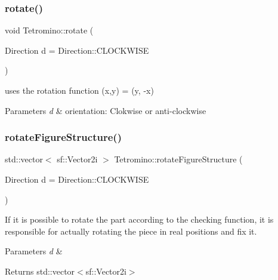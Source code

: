 \subsubsection{\texorpdfstring{rotate()}{rotate()}}
{\footnotesize\ttfamily void Tetromino\+::rotate (\begin{DoxyParamCaption}\item[{Direction}]{d = {\ttfamily Direction\+:\+:CLOCKWISE} }\end{DoxyParamCaption})\hspace{0.3cm}{\ttfamily [virtual]}}



uses the rotation function (x,y) = (y, -\/x) 


\begin{DoxyParams}{Parameters}
{\em d} & orientation\+: Clokwise or anti-\/clockwise \\
\hline
\end{DoxyParams}
\mbox{\label{classTetromino_ae067d0f05219f03a6b7f8e15e3cc67d0}} 
\subsubsection{\texorpdfstring{rotate\+Figure\+Structure()}{rotateFigureStructure()}}
{\footnotesize\ttfamily std\+::vector$<$ sf\+::\+Vector2i $>$ Tetromino\+::rotate\+Figure\+Structure (\begin{DoxyParamCaption}\item[{Direction}]{d = {\ttfamily Direction\+:\+:CLOCKWISE} }\end{DoxyParamCaption})}



If it is possible to rotate the part according to the checking function, it is responsible for actually rotating the piece in real positions and fix it. 


\begin{DoxyParams}{Parameters}
{\em d} & \\
\hline
\end{DoxyParams}
\begin{DoxyReturn}{Returns}
std\+::vector$<$sf\+::\+Vector2i$>$ 
\end{DoxyReturn}
\mbox{\label{classTetromino_a3ac5e896c58ed8490beac9ee833431e6}} 
